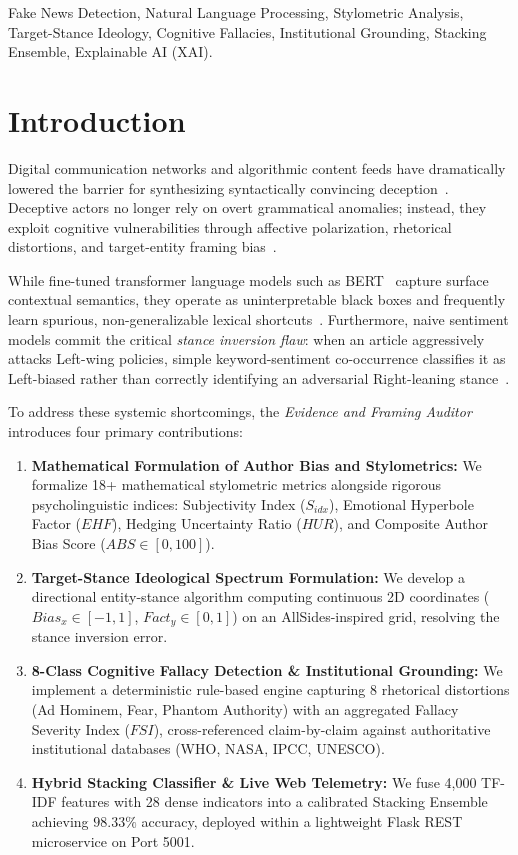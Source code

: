\documentclass[conference]{IEEEtran}
\begin{document}
\begin{IEEEkeywords}
Fake News Detection, Natural Language Processing, Stylometric Analysis, Target-Stance Ideology, Cognitive Fallacies, Institutional Grounding, Stacking Ensemble, Explainable AI (XAI).
\end{IEEEkeywords}

\section{Introduction}
Digital communication networks and algorithmic content feeds have dramatically lowered the barrier for synthesizing syntactically convincing deception~\cite{vosoughi2018spread, lazer2018science}. Deceptive actors no longer rely on overt grammatical anomalies; instead, they exploit cognitive vulnerabilities through affective polarization, rhetorical distortions, and target-entity framing bias~\cite{rubin2015deception, potthast2017stylometric}.

While fine-tuned transformer language models such as BERT~\cite{devlin2018bert} capture surface contextual semantics, they operate as uninterpretable black boxes and frequently learn spurious, non-generalizable lexical shortcuts~\cite{bai2024survey, xiao2024msynfd}. Furthermore, naive sentiment models commit the critical \textit{stance inversion flaw}: when an article aggressively attacks Left-wing policies, simple keyword-sentiment co-occurrence classifies it as Left-biased rather than correctly identifying an adversarial Right-leaning stance~\cite{sun2025prism}.

To address these systemic shortcomings, the \textit{Evidence and Framing Auditor} introduces four primary contributions:
\begin{enumerate}
    \item \textbf{Mathematical Formulation of Author Bias and Stylometrics:} We formalize 18+ mathematical stylometric metrics alongside rigorous psycholinguistic indices: Subjectivity Index ($S_{idx}$), Emotional Hyperbole Factor ($EHF$), Hedging Uncertainty Ratio ($HUR$), and Composite Author Bias Score ($ABS \in [0, 100]$).
    \item \textbf{Target-Stance Ideological Spectrum Formulation:} We develop a directional entity-stance algorithm computing continuous 2D coordinates ($Bias_x \in [-1, 1]$, $Fact_y \in [0, 1]$) on an AllSides-inspired grid, resolving the stance inversion error.
    \item \textbf{8-Class Cognitive Fallacy Detection \& Institutional Grounding:} We implement a deterministic rule-based engine capturing 8 rhetorical distortions (Ad Hominem, Fear, Phantom Authority) with an aggregated Fallacy Severity Index ($FSI$), cross-referenced claim-by-claim against authoritative institutional databases (WHO, NASA, IPCC, UNESCO).
    \item \textbf{Hybrid Stacking Classifier \& Live Web Telemetry:} We fuse 4,000 TF-IDF features with 28 dense indicators into a calibrated Stacking Ensemble achieving $98.33\%$ accuracy, deployed within a lightweight Flask REST microservice on Port 5001.
\end{enumerate}
\end{document}
